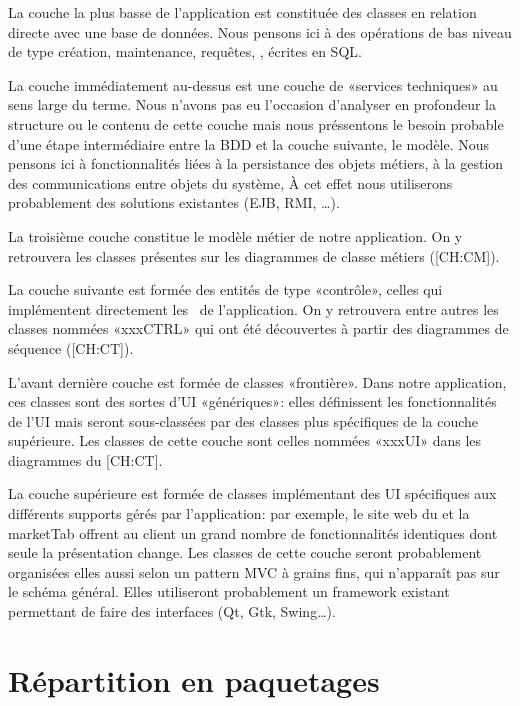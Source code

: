 \startitemize
\item La couche la plus basse de l'application est constituée des classes en relation directe avec une base de données. 
Nous pensons ici à des opérations de bas niveau de type création, maintenance, requêtes, \etc, écrites en SQL.
\item La couche immédiatement au-dessus est une couche de «services techniques» au sens large du terme.
Nous n'avons pas eu l'occasion d'analyser en profondeur la structure ou le contenu de cette couche mais nous préssentons le besoin probable d'une étape intermédiaire entre la BDD et la couche suivante, le modèle.
Nous pensons ici à fonctionnalités liées à la persistance des objets métiers, à la gestion des communications entre objets du système, \etc 
À cet effet nous utiliserons probablement des solutions existantes (EJB, RMI,  \dots).\par
\item La troisième couche constitue le modèle métier de notre application.
On y retrouvera les classes présentes sur les diagrammes de classe métiers ([CH:CM]).
\item La couche suivante est formée des entités de type «contrôle», \cad celles qui implémentent directement les \cu\ de l'application.
On y retrouvera entre autres les classes nommées «xxxCTRL» qui ont été découvertes à partir des diagrammes de séquence ([CH:CT]).
\item L'avant dernière couche est formée de classes «frontière». 
Dans notre application, ces classes sont des sortes d'UI «génériques»: elles définissent les fonctionnalités de l'UI mais seront sous-classées par des classes plus spécifiques de la couche supérieure.
Les classes de cette couche sont celles nommées «xxxUI» dans les diagrammes du [CH:CT].
\item La couche supérieure est formée de classes implémentant des UI spécifiques aux différents supports gérés par l'application: par exemple, le site web du \fm et la marketTab offrent au client un grand nombre de fonctionnalités identiques dont seule la présentation change.
Les classes de cette couche seront probablement organisées elles aussi selon un pattern MVC à grains fins, qui n'apparaît pas sur le schéma général.
Elles utiliseront probablement un framework existant permettant de faire des interfaces (Qt, Gtk, Swing\dots).
\stopitemize


\section{Répartition en paquetages}
